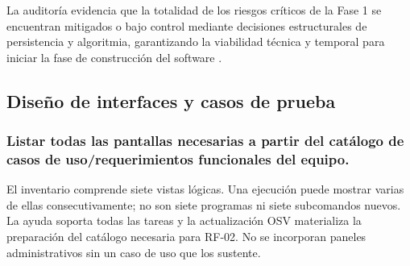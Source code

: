 La auditoría evidencia que la totalidad de los riesgos críticos de la Fase 1 se encuentran mitigados o bajo control mediante decisiones estructurales de persistencia y algoritmia, garantizando la viabilidad técnica y temporal para iniciar la fase de construcción del software \cite{torres2026proyecto, pressman2020software}.

\newpage

\clearpage

\subsection{Diseño de interfaces y casos de prueba}
\subsubsection{Listar todas las pantallas necesarias a partir del catálogo de casos de uso/\allowbreak requerimientos funcionales del equipo.}
El inventario comprende siete vistas lógicas. Una ejecución puede mostrar varias de ellas consecutivamente; no son siete programas ni siete subcomandos nuevos. La ayuda soporta todas las tareas y la actualización OSV materializa la preparación del catálogo necesaria para RF-02. No se incorporan paneles administrativos sin un caso de uso que los sustente.


